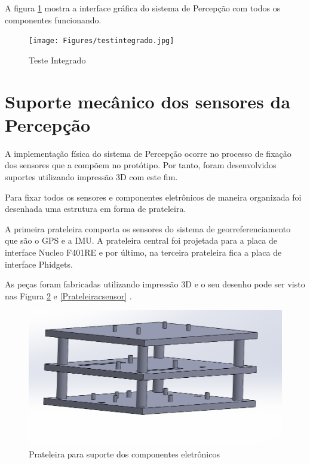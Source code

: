 A figura \ref{fig:testint} mostra a interface gráfica do sistema de Percepção com todos os componentes funcionando.

    \begin{figure}[!ht]
    	\centering
    	\texttt{[image: Figures/testintegrado.jpg]}
    	\caption{Teste Integrado} \label{fig:testint}
	\end{figure}

\section{Suporte mecânico dos sensores da Percepção}

A implementação física do sistema de Percepção ocorre no processo de fixação dos sensores que a compõem no protótipo. Por tanto, foram desenvolvidos suportes utilizando impressão 3D com este fim.

Para  fixar  todos  os  sensores  e  componentes  eletrônicos  de  maneira  organizada foi desenhada uma estrutura em forma de prateleira.

 A primeira prateleira comporta os sensores do sistema de georreferenciamento que são o GPS e a IMU. A prateleira central foi projetada para a placa de interface Nucleo F401RE e por último, na terceira prateleira fica a placa de interface Phidgets.
 
As peças foram fabricadas utilizando impressão 3D e o seu desenho pode ser visto nas Figura \ref{Prateleira} e \ref{Prateleiracsensor} .

 \begin{figure}[h]
 	\centering
 	\includegraphics[width=14cm]{Figures/prateleira.png}
 	\caption{Prateleira para suporte dos componentes eletrônicos} \label{Prateleira}
 \end{figure}
 
